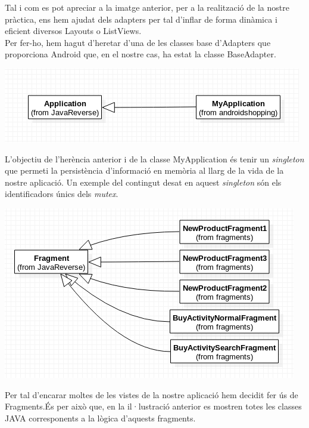 \documentclass{article}[]
\begin{document}
	 \newpage
	 	 Tal i com es pot apreciar a la imatge anterior, per a la realització de la nostre pràctica, ens hem ajudat dels adapters per tal d'inflar de forma dinàmica i eficient diversos Layouts o ListViews.\\
	
	Per fer-ho, hem hagut d'heretar d'una de les classes base d'Adapters que proporciona Android que, en el nostre cas, ha estat la classe BaseAdapter.
	 \begin{center}
	\includegraphics[scale=0.5]{img/3.png}
	\end{center}
	L'objectiu de l'herència anterior i de la classe MyApplication és tenir un \textit{singleton} que permeti la persistència d'informació en memòria al llarg de la vida de la nostre aplicació. Un exemple del contingut desat en aquest \textit{singleton} són els identificadors únics dels \textit{mutex}.
	\begin{center}
	\includegraphics[scale=0.5]{img/4.png}\\
\end{center}
	Per tal d'encarar moltes de les vistes de la nostre aplicació hem decidit fer ús de Fragments.És per això que, en la il·lustració anterior es mostren totes les classes JAVA corresponents a la lògica d'aquests fragments.\\
	
\end{document}
